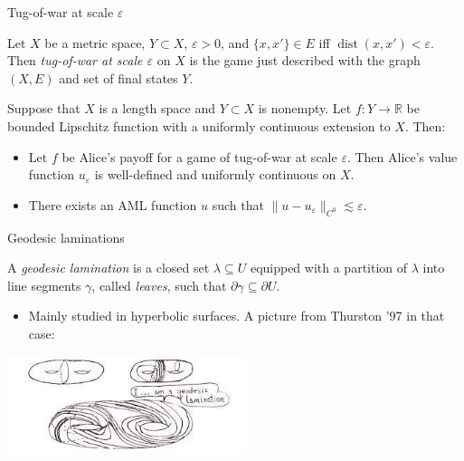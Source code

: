 \documentclass[10pt]{beamer}
\newcommand{\RR}{\mathbb{R}}
\DeclareMathOperator{\dist}{dist}
\begin{document}
\begin{frame}{Tug-of-war at scale $\varepsilon$}
\begin{definition}
Let $X$ be a metric space, $Y \subset X$, $\varepsilon > 0$, and $\{x, x'\} \in E$ iff $\dist(x, x') < \varepsilon$.
Then \emph{tug-of-war at scale $\varepsilon$} on $X$ is the game just described with the graph $(X, E)$ and set of final states $Y$.
\end{definition} 

\begin{theorem}
Suppose that $X$ is a length space and $Y \subset X$ is nonempty.
Let $f: Y \to \RR$ be bounded Lipschitz function with a uniformly continuous extension to $X$.
Then: 
\begin{itemize}
\item Let $f$ be Alice's payoff for a game of tug-of-war at scale $\varepsilon$.
Then Alice's value function $u_\varepsilon$ is well-defined and uniformly continuous on $X$.  
\item There exists an AML function $u$ such that $\|u - u_\varepsilon\|_{C^0} \lesssim \varepsilon$. 
\end{itemize}
\end{theorem}
\end{frame}

\begin{frame}{Geodesic laminations}
\begin{definition}
A \emph{geodesic lamination} is a closed set $\lambda \subseteq U$ equipped with a partition of $\lambda$ into line segments $\gamma$, called \emph{leaves}, such that $\partial \gamma \subseteq \partial U$. 
\end{definition}

\begin{itemize}
\item Mainly studied in hyperbolic surfaces. A picture from Thurston '97 in that case:
\end{itemize}

\centering 
\includegraphics[width=7cm]{GeodesicLamination.jpg}
    
\end{frame}
\end{document}

